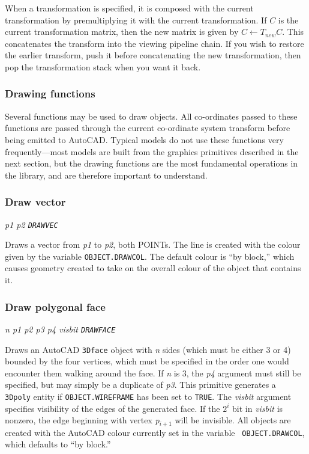 \documentclass{article}
\begin{document}
When a transformation is specified, it is composed with the current
transformation by premultiplying it with the current transformation.
If $C$ is the current transformation matrix, then the new matrix is
given by $C\leftarrow T_{new}C$.  This concatenates the transform into
the viewing pipeline chain.  If you wish to restore the earlier
transform, push it before concatenating the new transformation, then
pop the transformation stack when you want it back.

\subsubsection{Drawing functions}

Several functions may be used to draw objects.  All co-ordinates passed
to these functions are passed through the current co-ordinate system
transform before being emitted to AutoCAD\@.  Typical models do not use
these functions very frequently---most models are built from the
graphics primitives described in the next section, but the drawing
functions are the most fundamental operations in the library, and are
therefore important to understand.

\subsubsection{Draw vector}

{\em p1 p2 {\tt DRAWVEC}}

Draws a vector from {\em p1} to {\em p2}, both POINTs.  The line is created
with the colour given by the variable {\tt OBJECT.DRAWCOL}\@.  The
default colour is ``by block,'' which causes geometry created to take
on the overall colour of the object that contains it.

\subsubsection{Draw polygonal face}

{\em n p1 p2 p3 p4 visbit {\tt DRAWFACE}}

Draws an AutoCAD {\tt 3Dface} object with {\em n} sides (which must be
either 3 or 4) bounded by the four vertices, which must be specified
in the order one would encounter them walking around the face.  If
{\em n} is 3, the {\em p4} argument must still be specified, but may
simply be a duplicate of {\em p3}.  This primitive generates a {\tt
3Dpoly} entity if {\tt OBJECT.WIREFRAME} has been set to {\tt TRUE}.
The {\em visbit} argument specifies visibility of the edges of the
generated face.  If the $2^i$ bit in {\em visbit} is nonzero, the edge
beginning with vertex {\em p}$_{i+1}$ will be invisible.  All objects are
created with the AutoCAD colour currently set in the variable {\tt
OBJECT.DRAWCOL}, which defaults to ``by block.''
\end{document}
